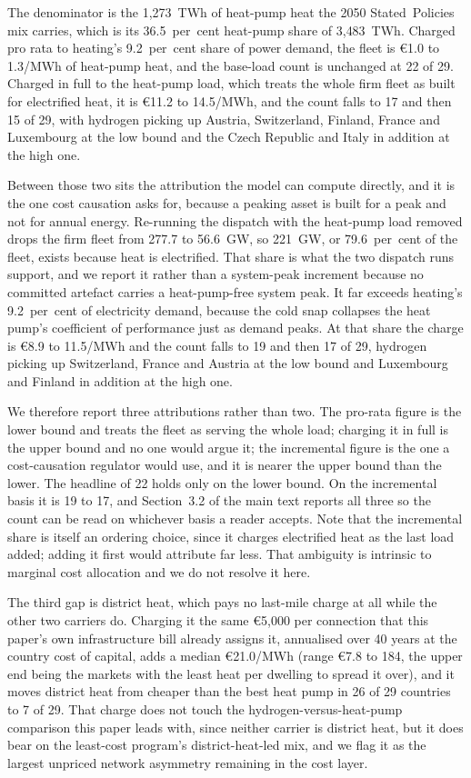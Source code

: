The denominator is the 1{,}273~TWh of heat-pump heat the 2050 Stated~Policies mix
carries, which is its 36.5~per~cent heat-pump share of 3{,}483~TWh. Charged pro rata to
heating's 9.2~per~cent share of power demand, the fleet is \euro{}1.0 to 1.3/MWh of
heat-pump heat, and the base-load count is unchanged at 22 of 29. Charged in full to the
heat-pump load, which treats the whole firm fleet as built for electrified heat, it is
\euro{}11.2 to 14.5/MWh, and the
count falls to 17 and then 15 of 29, with hydrogen picking up Austria, Switzerland,
Finland, France and Luxembourg at the low bound and the Czech Republic and Italy in
addition at the high one.

Between those two sits the attribution the model can compute directly, and it is the one
cost causation asks for, because a peaking asset is built for a peak and not for annual
energy. Re-running the dispatch with the heat-pump load removed drops the firm fleet from
277.7 to 56.6~GW, so 221~GW, or 79.6~per~cent of the fleet, exists because heat is
electrified. That share is what the two dispatch runs support, and we report it rather
than a system-peak increment because no committed artefact carries a heat-pump-free
system peak. It far exceeds heating's 9.2~per~cent of electricity demand, because the
cold snap collapses the heat pump's coefficient of performance just as demand peaks. At
that share the charge is \euro{}8.9 to 11.5/MWh and the count falls to 19 and then 17 of
29, hydrogen picking up Switzerland, France and Austria at the low bound and Luxembourg
and Finland in addition at the high one.

We therefore report three attributions rather than two. The pro-rata figure is the lower
bound and treats the fleet as serving the whole load; charging it in full is the upper
bound and no one would argue it; the incremental figure is the one a cost-causation
regulator would use, and it is nearer the upper bound than the lower. The headline of 22
holds only on the lower bound. On the incremental basis it is 19 to 17, and
Section~3.2 of the main text reports all three so the count can be read on whichever
basis a reader accepts. Note that the incremental share is itself an ordering choice, since it charges
electrified heat as the last load added; adding it first would attribute far less. That
ambiguity is intrinsic to marginal cost allocation and we do not resolve it here.

The third gap is district heat, which pays no last-mile charge at all while the
other two carriers do. Charging it the same \euro{}5{,}000 per connection that this
paper's own infrastructure bill already assigns it, annualised over 40 years at the
country cost of capital, adds a median \euro{}21.0/MWh (range \euro{}7.8 to 184, the
upper end being the markets with the least heat per dwelling to spread it over), and
it moves district heat from cheaper than the best heat pump in 26 of 29 countries to
7 of 29. That charge does not touch the hydrogen-versus-heat-pump comparison this
paper leads with, since neither carrier is district heat, but it does bear on the
least-cost program's district-heat-led mix, and we flag it as the largest unpriced
network asymmetry remaining in the cost layer.

